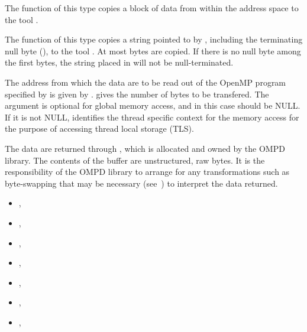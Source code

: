 \descr
The function  of this type copies a block of data from  
within the address space to the tool . 

The function  of this type copies a string pointed to by , 
including the terminating null byte (), to the tool . 
At most  bytes are copied. 
If there  is no null byte among the first  bytes, the string placed in 
 will not be null-terminated.


\argdesc
The address from which the data are to be read out of the OpenMP program
specified by  is given by .
 gives the number of bytes to be transfered.
The  argument is optional for global memory access,
and in this case should be NULL.
If it is not NULL,  identifies the thread
specific context for the memory access for the purpose of accessing
thread local storage (TLS).

The data are returned through , which is allocated and
owned by the OMPD library.
The contents of the buffer are unstructured, raw bytes.
It is the responsibility of the OMPD library to arrange for
any transformations such as byte-swapping that may be necessary
(see~) to interpret the
data returned.

\crossreferences
\begin{itemize}
\item
  , 
\item
  , 
\item
  , 
\item
  , 
\item
  , 
\item
  , 
\item
  , 
\end{itemize}

\label{subsubsubsec:ompd_callback_memory_write_fn_t}

